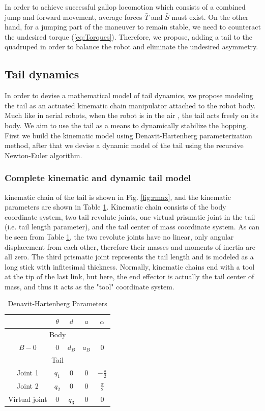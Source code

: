 In order to achieve successful gallop locomotion which consists of a combined jump and forward movement, average forces $\bar{T}$ and $\bar{S}$ must exist. On the other hand, for a jumping part of the maneuver to remain stable, we need to counteract the undesired torque (\ref{eq:Torques}). Therefore, we propose, adding a tail to the quadruped in order to balance the robot and eliminate the undesired asymmetry. 

\subsection{Tail dynamics}
In order to devise a mathematical model of tail dynamics, we propose modeling the tail as an actuated kinematic chain manipulator attached to the robot body. Much like in aerial robots, when the robot is in the air \cite{Korpela2013ICRA,Orsag2012JINT}, the tail acts freely on its body. We aim to use the tail as a means to dynamically stabilize the hopping. First we build the kinematic model using Denavit-Hartenberg parameterization method, after that we devise a dynamic model of the tail using the recursive Newton-Euler algorithm.
\subsubsection{Complete kinematic and dynamic tail model}
kinematic chain of the tail is shown in Fig. \ref{fig:rmax}, and the kinematic parameters are shown in Table \ref{tab:DHParameters}. Kinematic chain consists of the body coordinate system, two tail revolute joints, one virtual prismatic joint in the tail (i.e. tail length parameter), and the tail center of mass coordinate system. As can be seen from Table \ref{tab:DHParameters}, the two revolute joints have no linear, only angular displacement from each other, therefore their masses and moments of inertia are all zero. The third prismatic joint represents the tail length and is modeled as a long stick with infitesimal thickness. Normally, kinematic chains end with a tool at the tip of the last link, but here, the end effector is actually the tail center of mass, and thus it acts as the "tool" coordinate system.

\begin{table}
	\centering
		\begin{tabular}{ccccc}
		\hline
			& $\theta$ & $d$ & $a$ & $\alpha$ \\\hline
			\multicolumn{5}{c}{Body}\\\hline
			$B-0$ & $0$ & $d_B$ & $a_B$ & $0$\\\hline
			\multicolumn{5}{c}{Tail}\\\hline
			Joint 1 & $q_1$ & $0$ & $0$ & $-\frac{\pi}{2}$\\
			Joint 2 & $q_2$ & $0$ & $0$ & $\frac{\pi}{2}$\\
			Virtual joint& $0$ & $q_3$ & $0$ & $0$\\\hline
		\end{tabular}
	\caption{Denavit-Hartenberg Parameters}\label{tab:DHParameters}
\end{table}

